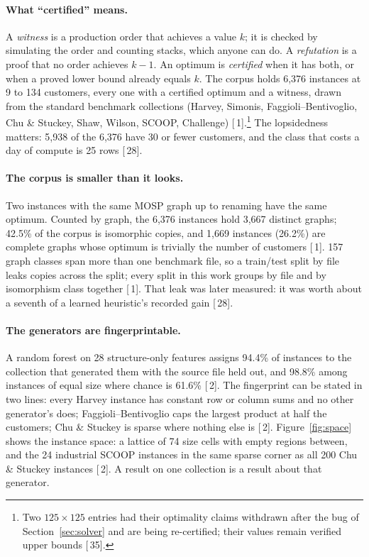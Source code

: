 \documentclass[11pt,a4paper]{article}
\renewcommand{\S}[1]{[\textsection\,#1]}
\begin{document}
\paragraph{What ``certified'' means.}
A \emph{witness} is a production order that achieves a value $k$; it is
checked by simulating the order and counting stacks, which anyone can do. A
\emph{refutation} is a proof that no order achieves $k-1$. An optimum is
\emph{certified} when it has both, or when a proved lower bound already
equals $k$. The corpus holds 6,376 instances at 9 to 134 customers, every one
with a certified optimum and a witness, drawn from the standard benchmark
collections (Harvey, Simonis, Faggioli--Bentivoglio, Chu \& Stuckey, Shaw,
Wilson, SCOOP, Challenge) \S{1}.\footnote{Two $125 \times 125$ entries had
their optimality claims withdrawn after the bug of Section~\ref{sec:solver}
and are being re-certified; their values remain verified upper bounds
\S{35}.} The lopsidedness matters: 5,938 of the 6,376 have 30 or fewer
customers, and the class that costs a day of compute is 25 rows \S{28}.

\paragraph{The corpus is smaller than it looks.}
Two instances with the same MOSP graph up to renaming have the same optimum.
Counted by graph, the 6,376 instances hold 3,667 distinct graphs; 42.5\% of
the corpus is isomorphic copies, and 1,669 instances (26.2\%) are complete
graphs whose optimum is trivially the number of customers \S{1}. 157 graph
classes span more than one benchmark file, so a train/test split by file
leaks copies across the split; every split in this work groups by file and
by isomorphism class together \S{1}. That leak was later measured: it was
worth about a seventh of a learned heuristic's recorded gain \S{28}.

\paragraph{The generators are fingerprintable.}
A random forest on 28 structure-only features assigns 94.4\% of instances to
the collection that generated them with the source file held out, and
98.8\% among instances of equal size where chance is 61.6\% \S{2}. The
fingerprint can be stated in two lines: every Harvey instance has constant row
or column sums and no other generator's does; Faggioli--Bentivoglio caps the
largest product at half the customers; Chu \& Stuckey is sparse where nothing
else is \S{2}. Figure~\ref{fig:space} shows the instance space: a lattice of
74 size cells with empty regions between, and the 24 industrial SCOOP
instances in the same sparse corner as all 200 Chu \& Stuckey instances
\S{2}. A result on one collection is a result about that generator.
\end{document}
